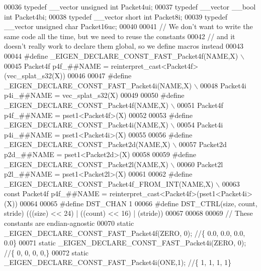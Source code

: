 \begin{DoxyCode}
00036 \textcolor{keyword}{typedef} \_\_vector \textcolor{keywordtype}{unsigned} \textcolor{keywordtype}{int}   Packet4ui;
00037 \textcolor{keyword}{typedef} \_\_vector \_\_bool \textcolor{keywordtype}{int}     Packet4bi;
00038 \textcolor{keyword}{typedef} \_\_vector \textcolor{keywordtype}{short} \textcolor{keywordtype}{int}      Packet8i;
00039 \textcolor{keyword}{typedef} \_\_vector \textcolor{keywordtype}{unsigned} \textcolor{keywordtype}{char}  Packet16uc;
00040 
00041 \textcolor{comment}{// We don't want to write the same code all the time, but we need to reuse the constants}
00042 \textcolor{comment}{// and it doesn't really work to declare them global, so we define macros instead}
00043 
00044 \textcolor{preprocessor}{#define \_EIGEN\_DECLARE\_CONST\_FAST\_Packet4f(NAME,X) \(\backslash\)}
00045 \textcolor{preprocessor}{  Packet4f p4f\_##NAME = reinterpret\_cast<Packet4f>(vec\_splat\_s32(X))}
00046 
00047 \textcolor{preprocessor}{#define \_EIGEN\_DECLARE\_CONST\_FAST\_Packet4i(NAME,X) \(\backslash\)}
00048 \textcolor{preprocessor}{  Packet4i p4i\_##NAME = vec\_splat\_s32(X)}
00049 
00050 \textcolor{preprocessor}{#define \_EIGEN\_DECLARE\_CONST\_Packet4f(NAME,X) \(\backslash\)}
00051 \textcolor{preprocessor}{  Packet4f p4f\_##NAME = pset1<Packet4f>(X)}
00052 
00053 \textcolor{preprocessor}{#define \_EIGEN\_DECLARE\_CONST\_Packet4i(NAME,X) \(\backslash\)}
00054 \textcolor{preprocessor}{  Packet4i p4i\_##NAME = pset1<Packet4i>(X)}
00055 
00056 \textcolor{preprocessor}{#define \_EIGEN\_DECLARE\_CONST\_Packet2d(NAME,X) \(\backslash\)}
00057 \textcolor{preprocessor}{  Packet2d p2d\_##NAME = pset1<Packet2d>(X)}
00058 
00059 \textcolor{preprocessor}{#define \_EIGEN\_DECLARE\_CONST\_Packet2l(NAME,X) \(\backslash\)}
00060 \textcolor{preprocessor}{  Packet2l p2l\_##NAME = pset1<Packet2l>(X)}
00061 
00062 \textcolor{preprocessor}{#define \_EIGEN\_DECLARE\_CONST\_Packet4f\_FROM\_INT(NAME,X) \(\backslash\)}
00063 \textcolor{preprocessor}{  const Packet4f p4f\_##NAME = reinterpret\_cast<Packet4f>(pset1<Packet4i>(X))}
00064 
00065 \textcolor{preprocessor}{#define DST\_CHAN 1}
00066 \textcolor{preprocessor}{#define DST\_CTRL(size, count, stride) (((size) << 24) | ((count) << 16) | (stride))}
00067 
00068 
00069 \textcolor{comment}{// These constants are endian-agnostic}
00070 \textcolor{keyword}{static} \_EIGEN\_DECLARE\_CONST\_FAST\_Packet4f(ZERO, 0); \textcolor{comment}{//\{ 0.0, 0.0, 0.0, 0.0\}}
00071 \textcolor{keyword}{static} \_EIGEN\_DECLARE\_CONST\_FAST\_Packet4i(ZERO, 0); \textcolor{comment}{//\{ 0, 0, 0, 0,\}}
00072 \textcolor{keyword}{static} \_EIGEN\_DECLARE\_CONST\_FAST\_Packet4i(ONE,1); \textcolor{comment}{//\{ 1, 1, 1, 1\}}

\end{DoxyCode}
